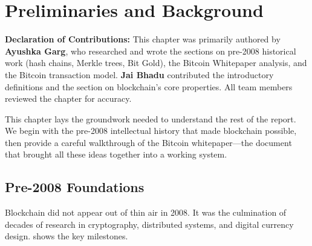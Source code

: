 \chapter{Preliminaries and Background}
\label{ch:background}

\noindent\textbf{Declaration of Contributions:} This chapter was primarily authored by \textbf{Ayushka Garg}, who researched and wrote the sections on pre-2008 historical work (hash chains, Merkle trees, Bit Gold), the Bitcoin Whitepaper analysis, and the Bitcoin transaction model. \textbf{Jai Bhadu} contributed the introductory definitions and the section on blockchain's core properties. All team members reviewed the chapter for accuracy.

\bigskip

This chapter lays the groundwork needed to understand the rest of the report. We begin with the pre-2008 intellectual history that made blockchain possible, then provide a careful walkthrough of the Bitcoin whitepaper---the document that brought all these ideas together into a working system.

\section{Pre-2008 Foundations}
\label{sec:pre2008}

Blockchain did not appear out of thin air in 2008. It was the culmination of decades of research in cryptography, distributed systems, and digital currency design.  shows the key milestones.

